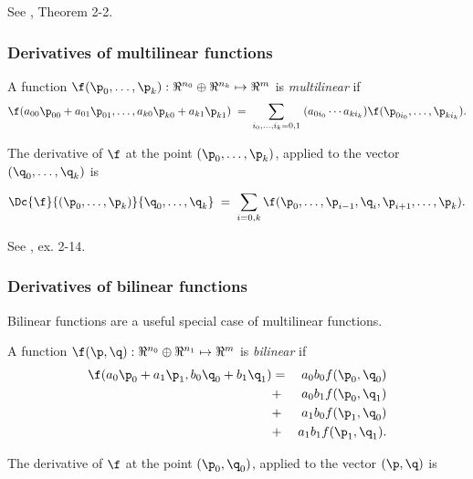 See \cite{spivak-1965}, Theorem 2-2.



\subsubsection{Derivatives of multilinear functions}
\label{sec:multilinear}

A function $\f(\p_0,\ldots,\p_k):\Re^{n_0} \oplus \Re^{n_k} \mapsto \Re^m$
is {\it multilinear} if
\begin{equation}
\f(a_{00} \p_{00} + a_{01} \p_{01}, \ldots, a_{k0} \p_{k0} + a_{k1} \p_{k1})
\; = \; \sum_{i_0,\ldots,i_k = 0,1} \;(a_{0i_0} \cdots a_{ki_k}) \f(\p_{0i_0}, \ldots, \p_{ki_k}).
\end{equation}

The derivative of $\f$
at the point $(\p_0,\ldots,\p_k)$, applied to the vector $(\q_0,\ldots,\q_k)$ is

\begin{equation}
\Dc{\f}{(\p_0,\ldots,\p_k)}{\q_0,\ldots,\q_k}
\; = \; \sum_{i=0,k} \f(\p_0,\ldots,\p_{i-1},\q_i,\p_{i+1},\ldots,\p_k).
\end{equation}

See \cite{spivak-1965}, ex. 2-14.



\subsubsection{Derivatives of bilinear functions}
\label{sec:bilinear}

Bilinear functions are a useful special case of multilinear functions.

A function $\f(\p,\q):\Re^{n_0} \oplus \Re^{n_1} \mapsto \Re^m$
is {\it bilinear} if
\begin{eqnarray}
\f(a_0 \p_0 + a_1 \p_1, b_0 \q_0 + b_1 \q_1) & = & a_0 b_0 f(\p_0,\q_0)  \\
                                             & + & a_0 b_1 f(\p_0,\q_1) \nonumber \\
                                             & + & a_1 b_0 f(\p_1,\q_0) \nonumber \\
                                             & + & a_1 b_1 f(\p_1,\q_1).\nonumber
\end{eqnarray}

The derivative of $\f$
at the point $(\p_0,\q_0)$, applied to the vector $(\p,\q)$ is

